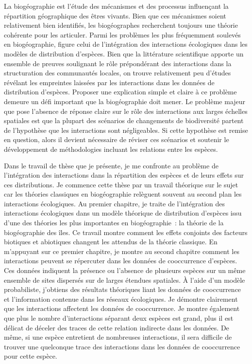 La biogéographie est l'étude des mécanismes et des processus influençant
la répartition géographique des êtres vivants. Bien que ces mécanismes
soient relativement bien identifiés, les biogéographes recherchent
toujours une théorie cohérente pour les articuler. Parmi les problèmes
les plus fréquemment soulevés en biogéographie, figure celui de
l'intégration des interactions écologiques dans les modèles de
distribution d'espèces. Bien que la littérature scientifique apporte un
ensemble de preuves soulignant le rôle prépondérant des interactions
dans la structuration des communautés locales, on trouve relativement
peu d'études révélant les empreintes laissées par les interactions dans
les données de distribution d'espèces. Proposer une explication simple
et claire à ce problème demeure un défi important que la biogéographie
doit mener. Le problème majeur que pose l'absence de réponse claire sur
le rôle des interactions aux larges échelles spatiales est que la
plupart des scénarios de changements de biodiversité partent de
l'hypothèse que les interactions sont négligeables. Si cette hypothèse
est remise en question, alors il devient nécessaire de réviser ces
scénarios et soutenir le développement de méthodologies incluant les
relations entre les espèces.

Dans le travail de thèse que je présente, je me confronte au problème de
l'intégration des interactions dans la répartition des espèces et de
leurs effets sur ces distributions. Je commence cette thèse par un
travail théorique sur le sujet car les théories classiques en
biogéographie relèguent souvent au second plan les interactions
écologiques. Au premier chapitre, je traite de l'intégration des
interactions écologiques dans un modèle théorique de distribution
d'espèces issu d'une des théories les plus importantes en
biogéographie~: la théorie de la biogéographie des îles. Ce travail
montre comment les effets conjoints des facteurs biotiques et abiotiques
changent les attendus de la théorie classique. En m'appuyant sur ce
premier chapitre, je montre au second chapitre comment les interactions
peuvent se répercuter dans les données de cooccurrence d'espèces. Ces
données indiquent la présence ou l'absence de plusieurs espèces sur un
même ensemble de sites dispersés sur de larges étendues spatiales. À
l'aide d'un modèle probabiliste, j'obtiens des résultats théoriques
liant les données de cooccurrence et l'information contenue dans les
réseaux écologiques. Je démontre clairement que les interactions
affectent les données de cooccurrence. Je montre également que plus le
nombre d'interactions séparant deux espèces est grand, plus il est
délicat de déceler des traces de cette relation indirecte dans les
données. De même, si une espèce entretient de nombreuses interactions,
il sera difficile de trouver une quelconque trace des interactions dans
les données de cooccurrence pour cette espèce.


